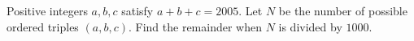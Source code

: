 Positive integers $a,b,c$ satisfy $a+b+c=2005$. Let $N$ be the number of possible ordered triples $(a,b,c)$. Find the remainder when $N$ is divided by $1000$.
